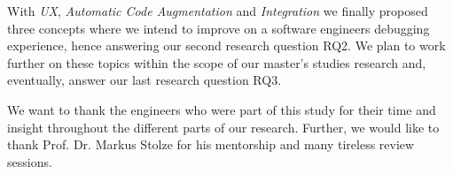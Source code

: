 \documentclass[sigplan,screen,review]{acmart}
\begin{document}
With \emph{UX}, \emph{Automatic Code Augmentation} and \emph{Integration} we finally proposed three concepts where we intend to improve on a software engineers debugging experience, hence answering our second research question RQ2. We plan to work further on these topics within the scope of our master's studies research and, eventually, answer our last research question RQ3.


\begin{acks}
	We want to thank the engineers who were part of this study for their time and insight throughout the different parts of our research. Further, we would like to thank Prof. Dr. Markus Stolze for his mentorship and many tireless review sessions.
\end{acks}



\end{document}
